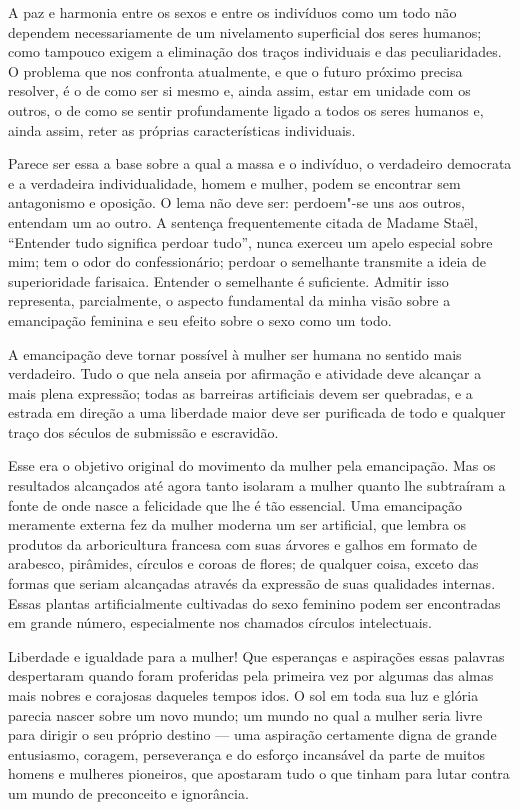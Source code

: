 A paz e harmonia entre os sexos e entre os indivíduos como um todo não
dependem necessariamente de um nivelamento superficial dos seres
humanos; como tampouco exigem a eliminação dos traços individuais e das
peculiaridades. O problema que nos confronta atualmente, e que o futuro
próximo precisa resolver, é o de como ser si mesmo e, ainda assim, estar
em unidade com os outros, o de como se sentir profundamente ligado a
todos os seres humanos e, ainda assim, reter as próprias características
individuais.

Parece ser essa a base sobre a qual a massa e o indivíduo, o
verdadeiro democrata e a verdadeira individualidade, homem e mulher, podem se
encontrar sem antagonismo e oposição. O lema não deve ser: perdoem"-se
uns aos outros, entendam um ao outro. A sentença frequentemente citada
de Madame Staël, ``Entender tudo significa perdoar tudo'', nunca exerceu
um apelo especial sobre mim; tem o odor do confessionário; perdoar o
semelhante transmite a ideia de superioridade farisaica. Entender o
semelhante é suficiente. Admitir isso representa,
parcialmente, o aspecto fundamental da minha visão sobre a emancipação feminina
e seu efeito sobre o sexo como um todo.

A emancipação deve tornar possível à mulher ser humana no sentido mais
verdadeiro. Tudo o que nela anseia por afirmação e atividade deve
alcançar a mais plena expressão; todas as barreiras artificiais devem
ser quebradas, e a estrada em direção a uma liberdade maior deve ser
purificada de todo e qualquer traço dos séculos de submissão e
escravidão.

Esse era o objetivo original do movimento da mulher pela emancipação.
Mas os resultados alcançados até agora tanto isolaram a mulher quanto
lhe subtraíram a fonte de onde nasce a felicidade que lhe é tão essencial.
Uma emancipação meramente externa fez da mulher moderna um ser
artificial, que lembra os produtos da arboricultura francesa com suas
árvores e galhos em formato de arabesco, pirâmides, círculos e coroas de
flores; de qualquer coisa, exceto das formas que seriam alcançadas
através da expressão de suas qualidades internas. Essas plantas
artificialmente cultivadas do sexo feminino podem ser encontradas em
grande número, especialmente nos chamados círculos intelectuais. 

Liberdade e igualdade para a mulher! Que esperanças e aspirações essas
palavras despertaram quando foram proferidas pela primeira vez por
algumas das almas mais nobres e corajosas daqueles tempos idos. O sol em
toda sua luz e glória parecia nascer sobre um novo mundo; um mundo no
qual a mulher seria livre para dirigir o seu próprio destino --- uma
aspiração certamente digna de grande entusiasmo, coragem, perseverança e
do esforço incansável da parte de muitos homens e mulheres pioneiros,
que apostaram tudo o que tinham para lutar contra um mundo de
preconceito e ignorância.

